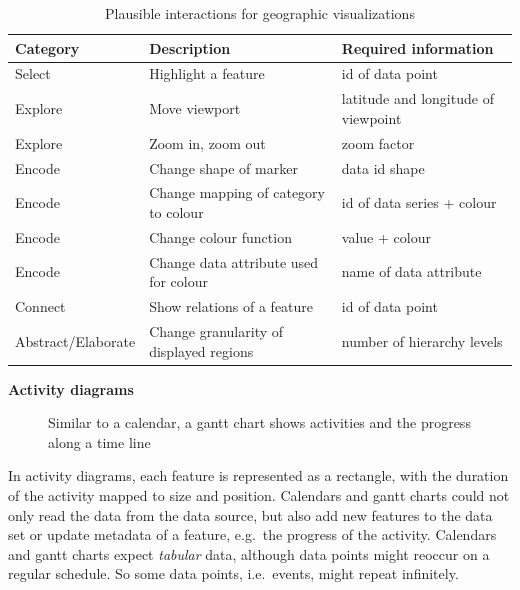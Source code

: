 \begin{table}[H]
  \begin{tabular*}{\textwidth}{lll}
    \bf Category & \bf Description & \bf Required information \\
    \hline
    Select & Highlight a feature & id of data point \\
    Explore & Move viewport & latitude and longitude of viewpoint \\
    Explore & Zoom in, zoom out & zoom factor \\
    Encode & Change shape of marker & data id  shape \\
    Encode & Change mapping of category to colour & id of data series + colour \\
    Encode & Change colour function & value + colour \\
    Encode & Change data attribute used for colour & name of data attribute \\
    Connect & Show relations of a feature & id of data point  \\
    Abstract/Elaborate & Change granularity of displayed regions & number of hierarchy levels \\
  \end{tabular*}
  \caption{Plausible interactions for geographic visualizations}%
  \label{tab:analysis:geographical:interactions}
\end{table}

\textbf{Activity diagrams}
\begin{figure}
  \centering
    \qquad
    \caption{Similar to a calendar, a gantt chart shows activities and the progress along a time line}%
    \label{fig:analysis:temporal}
\end{figure}

In activity diagrams, each feature is represented as a rectangle, with the duration of the activity mapped to size and position.
Calendars and gantt charts could not only read the data from the data source, but also add new features to the data set or update metadata of a feature, e.g.\ the progress of the activity.
Calendars and gantt charts expect \emph{tabular} data, although data points might reoccur on a regular schedule.
So some data points, i.e.\ events, might repeat infinitely.

